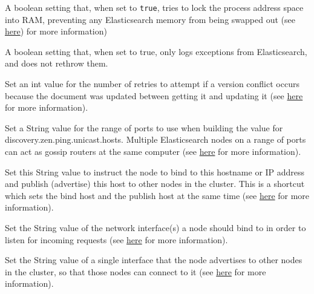 \begin{description}
\tightlist
\item[\texttt{bootstrapMlockAll=false}]
A boolean setting that, when set to \texttt{true}, tries to lock the
process address space into RAM, preventing any Elasticsearch memory from
being swapped out (see
\href{https://www.elastic.co/guide/en/elasticsearch/reference/7.x/setup-configuration-memory.html\#bootstrap-memory_lock}{here})
for more information)
\item[\texttt{logExceptionsOnly=true}]
A boolean setting that, when set to true, only logs exceptions from
Elasticsearch, and does not rethrow them.
\item[\texttt{retryOnConflict=5}]
Set an int value for the number of retries to attempt if a version
conflict occurs because the document was updated between getting it and
updating it (see
\href{https://www.elastic.co/guide/en/elasticsearch/reference/7.x/docs-update.html\#docs-update-api-query-params}{here}
for more information).
\item[\texttt{discoveryZenPingUnicastHostsPort=9300-9400}]
Set a String value for the range of ports to use when building the value
for discovery.zen.ping.unicast.hosts. Multiple Elasticsearch nodes on a
range of ports can act as gossip routers at the same computer (see
\href{https://www.elastic.co/guide/en/elasticsearch/reference/7.x/modules-discovery-hosts-providers.html}{here}
for more information).
\item[\texttt{networkHost=}]
Set this String value to instruct the node to bind to this hostname or
IP address and publish (advertise) this host to other nodes in the
cluster. This is a shortcut which sets the bind host and the publish
host at the same time (see
\href{https://www.elastic.co/guide/en/elasticsearch/reference/7.x/modules-network.html\#common-network-settings}{here}
for more information).
\item[\texttt{networkBindHost=}]
Set the String value of the network interface(s) a node should bind to
in order to listen for incoming requests (see
\href{https://www.elastic.co/guide/en/elasticsearch/reference/7.x/modules-network.html\#advanced-network-settings}{here}
for more information).
\item[\texttt{networkPublishHost=}]
Set the String value of a single interface that the node advertises to
other nodes in the cluster, so that those nodes can connect to it (see
\href{https://www.elastic.co/guide/en/elasticsearch/reference/7.x/modules-network.html\#advanced-network-settings}{here}
for more information).

\end{description}
